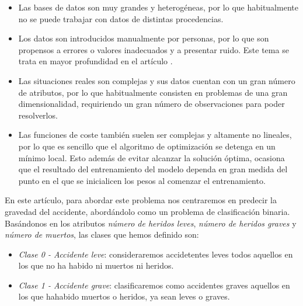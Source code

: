 \documentclass[journal,twoside]{JoPhA}
\begin{document}
\begin{itemize}
	\item Las bases de datos son muy grandes y heterogéneas, por lo que habitualmente no se puede trabajar con datos de distintas procedencias. \\
	
	\item Los datos son introducidos manualmente por personas, por lo que son propensos a errores o valores inadecuados y a presentar ruido. Este tema se trata en mayor profundidad en el artículo  \cite{analisis_datos}. \\

	\item Las situaciones reales son complejas y sus datos cuentan con un gran número de atributos, por lo que habitualmente consisten en problemas de una gran dimensionalidad, requiriendo un gran número de observaciones para poder resolverlos. \\
	
	\item Las funciones de coste también suelen ser complejas y altamente no lineales, por lo que es sencillo que el algoritmo de optimización se detenga en un mínimo local. Esto además de evitar alcanzar la solución óptima, ocasiona que el resultado del entrenamiento del modelo dependa en gran medida del punto en el que se inicialicen los pesos al comenzar el entrenamiento. \\
\end{itemize}


En este artículo, para abordar este problema nos centraremos en predecir la gravedad del accidente, abordándolo como un problema de clasificación binaria. Basándonos en los atributos \emph{número de heridos leves}, \emph{número de heridos graves} y \emph{número de muertos}, las clases que hemos definido son: \\

\begin{itemize}
	\item \textit{Clase 0 - Accidente leve}: consideraremos accidetentes leves todos aquellos en los que no ha habido ni muertos ni heridos. \\
	\item \textit{Clase 1 - Accidente grave}: clasificaremos como accidentes graves aquellos en los que hahabido muertos o heridos, ya sean leves o graves. \\ 
\end{itemize}
\end{document}
